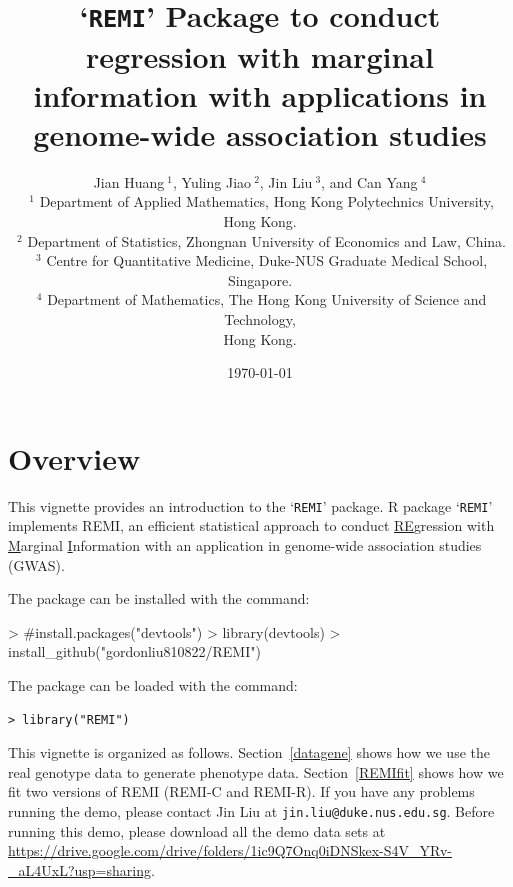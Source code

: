 \documentclass[11pt]{article}
\title{`\texttt{REMI}' Package to conduct regression with marginal information with applications in genome-wide association studies}
\author{Jian Huang$~^1$, Yuling Jiao$~^{2}$, Jin Liu$~^3$, and Can Yang$~^4$\\
$~^1$ Department of Applied Mathematics, Hong Kong Polytechnics
University, Hong Kong.\\
$~^2$ Department of Statistics, Zhongnan University of Economics and Law, China.\\
$~^3$ Centre for Quantitative Medicine, Duke-NUS Graduate Medical School, Singapore.\\
$~^4$ Department of Mathematics, The Hong Kong University of Science and Technology,\\
Hong Kong.\\
}
\date{\today}
\begin{document}

\maketitle

\section{Overview}
This vignette provides an introduction to the `\texttt{REMI}' package.
R package `\texttt{REMI}' implements REMI, an efficient statistical approach to conduct \underline{RE}gression with \underline{M}arginal \underline{I}nformation with an application in genome-wide association studies (GWAS).

The package can be installed with the command:
\begin{Schunk}
\begin{Sinput}
> #install.packages("devtools")
> library(devtools)
> install_github("gordonliu810822/REMI")
\end{Sinput}
\end{Schunk}

The package can be loaded with the command:
\begin{verbatim}
> library("REMI")
\end{verbatim}

This vignette is organized as follows.
Section~\ref{datagene} shows how we use the real genotype data to generate phenotype data.
Section~\ref{REMIfit} shows how we fit two versions of REMI (REMI-C and REMI-R). If you have any problems running the demo, please contact Jin Liu at \texttt{jin.liu@duke.nus.edu.sg}. Before running this demo, please download all the demo data sets at \url{https://drive.google.com/drive/folders/1ic9Q7Onq0iDNSkex-S4V_YRv-_aL4UxL?usp=sharing}.
\end{document}

